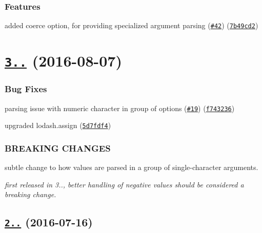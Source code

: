 \subsubsection*{Features}


\begin{DoxyItemize}
\item added coerce option, for providing specialized argument parsing (\href{https://github.com/yargs/yargs-parser/issues/42}{\tt \#42}) (\href{https://github.com/yargs/yargs-parser/commit/7b49cd2}{\tt 7b49cd2})
\end{DoxyItemize}

\label{_3.0.0}%
 \section*{\href{https://github.com/yargs/yargs-parser/compare/v2.4.1...v3.0.0}{\tt 3..} (2016-\/08-\/07)}

\subsubsection*{Bug Fixes}


\begin{DoxyItemize}
\item parsing issue with numeric character in group of options (\href{https://github.com/yargs/yargs-parser/issues/19}{\tt \#19}) (\href{https://github.com/yargs/yargs-parser/commit/f743236}{\tt f743236})
\item upgraded lodash.\+assign (\href{https://github.com/yargs/yargs-parser/commit/5d7fdf4}{\tt 5d7fdf4})
\end{DoxyItemize}

\subsubsection*{B\+R\+E\+A\+K\+I\+NG C\+H\+A\+N\+G\+ES}


\begin{DoxyItemize}
\item subtle change to how values are parsed in a group of single-\/character arguments.
\item {\itshape first released in 3.., better handling of negative values should be considered a breaking change.}
\end{DoxyItemize}

\label{_2.4.1}%
 \subsection*{\href{https://github.com/yargs/yargs-parser/compare/v2.4.0...v2.4.1}{\tt 2..} (2016-\/07-\/16)}


